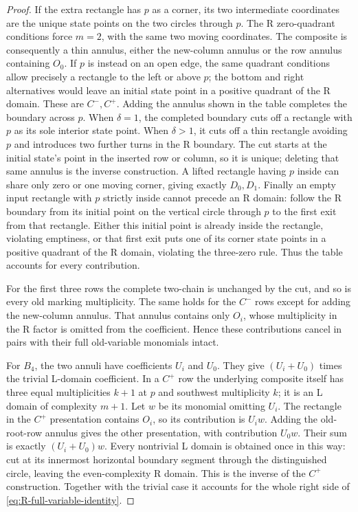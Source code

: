 \documentclass[11pt,a4paper]{article}
\theoremstyle{remark}
\begin{document}
\begin{proof}
If the extra rectangle has $p$ as a corner, its two intermediate
coordinates are the unique state points on the two circles through
$p$.  The R zero-quadrant conditions force $m=2$, with the same
two moving coordinates.  The composite is consequently a thin
annulus, either the new-column annulus or the row annulus containing
$O_0$.  If $p$ is instead on an open edge, the same quadrant conditions
allow precisely a rectangle to the left or above $p$; the bottom and
right alternatives would leave an initial state point in a positive
quadrant of the R domain.  These are $C^-,C^+$.  Adding the annulus
shown in the table completes the boundary across $p$.  When
$\delta=1$, the completed boundary cuts off a rectangle with $p$ as
its sole interior state point.  When $\delta>1$, it cuts off a thin
rectangle avoiding $p$ and introduces two further turns in the R
boundary.  The cut starts at the initial state's point in the
inserted row or column, so it is unique; deleting that same annulus
is the inverse construction.  A lifted rectangle having $p$ inside
can share only zero or one moving corner, giving exactly $D_0,D_1$.
Finally an empty input rectangle with $p$ strictly inside cannot
precede an R domain: follow the R boundary from its initial point on
the vertical circle through $p$ to the first exit from that rectangle.
Either this initial point is already inside the rectangle, violating
emptiness, or that first exit puts one of its corner state points in
a positive quadrant of the R domain, violating the three-zero rule.
Thus the table accounts for every contribution.

For the first three rows the complete two-chain is unchanged by the
cut, and so is every old marking multiplicity.  The same holds for
the $C^-$ rows except for adding the new-column annulus.  That
annulus contains only $O_i$, whose multiplicity in the R factor is
omitted from the coefficient.  Hence these contributions cancel in
pairs with their full old-variable monomials intact.

For $B_4$, the two annuli have coefficients $U_i$ and $U_0$.  They
give $(U_i+U_0)$ times the trivial L-domain coefficient.  In a $C^+$
row the underlying composite itself has three equal multiplicities
$k+1$ at $p$ and southwest multiplicity $k$; it is an L domain of
complexity $m+1$.  Let $w$ be its monomial omitting $U_i$.  The
rectangle in the $C^+$ presentation contains $O_i$, so its
contribution is $U_iw$.  Adding the old-root-row annulus gives the
other presentation, with contribution $U_0w$.  Their sum is exactly
$(U_i+U_0)w$.  Every nontrivial L domain is obtained once in this
way: cut at its innermost horizontal boundary segment through the
distinguished circle, leaving the even-complexity R domain.  This
is the inverse of the $C^+$ construction.  Together with the trivial
case it accounts for the whole right side of
\eqref{eq:R-full-variable-identity}.


\end{proof}
\end{document}
